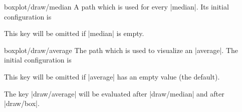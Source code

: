 \begin{pgfplotscodekey}{boxplot/draw/median}
	A path which is used for every |median|. Its initial configuration is
\begin{codeexample}
\end{codeexample}
	This key will be omitted if |median| is empty.
\end{pgfplotscodekey}

\begin{pgfplotscodekey}{boxplot/draw/average}
	The path which is used to visualize an |average|. The initial configuration is
\begin{codeexample}
\end{codeexample}
	This key will be omitted if |average| has an empty value (the default).

	The key |draw/average| will be evaluated after |draw/median| and after |draw/box|.
\end{pgfplotscodekey}

\endgroup

